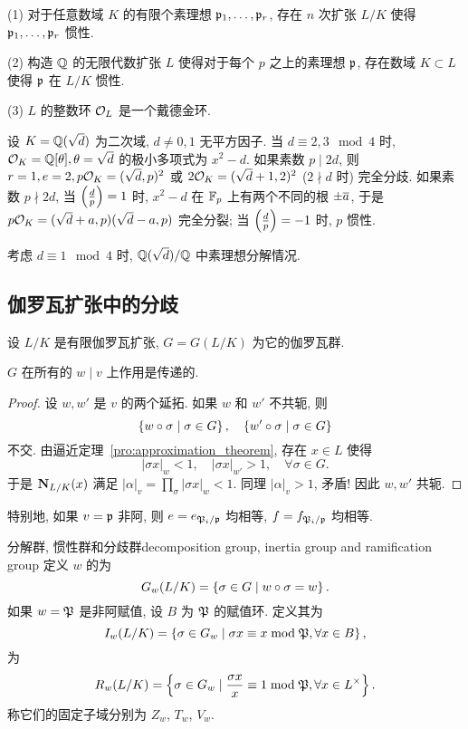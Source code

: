 \begin{exercise}
(1) 对于任意数域 $K$ 的有限个素理想 ${\mathfrak{p}}_1,\dots,{\mathfrak{p}}_r$, 存在 $n$ 次扩张 $L/K$ 使得 ${\mathfrak{p}}_1,\dots,{\mathfrak{p}}_r$ 惯性.

(2) 构造 ${\mathbb{Q}}$ 的无限代数扩张 $L$ 使得对于每个 $p$ 之上的素理想 ${\mathfrak{p}}$, 存在数域 $K\subset L$ 使得 ${\mathfrak{p}}$ 在 $L/K$ 惯性.

(3) $L$ 的整数环 ${\mathcal{O}}_L$ 是一个戴德金环.
\end{exercise}

\begin{example}
设 $K={\mathbb{Q}}(\sqrt{d})$ 为二次域, $d\neq 0,1$ 无平方因子. 
当 $d\equiv 2,3\mod 4$ 时, ${\mathcal{O}}_K={\mathbb{Q}}[\theta],\theta=\sqrt{d}$ 的极小多项式为 $x^2-d$. 如果素数 $p\mid 2d$, 则 $r=1,e=2,p{\mathcal{O}}_K=(\sqrt{d},p)^2$ 或 $2{\mathcal{O}}_K=(\sqrt{d}+1,2)^2$ ($2\nmid d$ 时) 完全分歧.  如果素数 $p\nmid 2d$, 当 $\left(\frac{{d}}{p}\right)=1$ 时, $x^2-d$ 在 ${\mathbb{F}}_p$ 上有两个不同的根 $\pm\overline a$, 于是 $p{\mathcal{O}}_K=(\sqrt{d}+a,p)(\sqrt{d}-a,p)$ 完全分裂; 当 $\left(\frac{{d}}{p}\right)=-1$ 时, $p$ 惯性.
\end{example}

\begin{exercise}
考虑 $d\equiv 1\mod 4$ 时, ${\mathbb{Q}}(\sqrt{d})/{\mathbb{Q}}$ 中素理想分解情况.
\end{exercise}


\subsection{伽罗瓦扩张中的分歧}
设 $L/K$ 是有限伽罗瓦扩张, $G=G(L/K)$ 为它的伽罗瓦群.
\begin{proposition}{}{}
$G$ 在所有的 $w\mid v$ 上作用是传递的.
\end{proposition}
\begin{proof}
设 $w,w'$ 是 $v$ 的两个延拓. 如果 $w$ 和 $w'$ 不共轭, 则
  \[\left\{w\circ \sigma\mid \sigma\in G\right\},\quad
\left\{w'\circ\sigma\mid\sigma\in G\right\}\]
不交. 由逼近定理~\ref{pro:approximation_theorem}, 存在 $x\in L$ 使得
  \[|\sigma x|_w<1,\quad |\sigma x|_{w'}>1,\quad\forall \sigma\in G.\]
于是 ${\mathbf{N}}_{L/K}(x)$ 满足 $|\alpha|_v=\prod_\sigma|\sigma x|_w<1$. 同理 $|\alpha|_v>1$, 矛盾! 因此 $w,w'$ 共轭.
\end{proof}

特别地, 如果 $v={\mathfrak{p}}$ 非阿, 则 $e=e_{{\mathfrak{P}}_i/{\mathfrak{p}}}$ 均相等, $f=f_{{\mathfrak{P}}_i/{\mathfrak{p}}}$ 均相等.

\begin{definition}{分解群, 惯性群和分歧群}{decomposition group, inertia group and ramification group}
定义 $w$ 的为
  \[G_w(L/K)=\left\{\sigma\in G\mid  w\circ \sigma=w\right\}.\]
如果 $w={\mathfrak{P}}$ 是非阿赋值, 设 $B$ 为 ${\mathfrak{P}}$ 的赋值环. 定义其为
  \[I_w(L/K)=\left\{\sigma\in G_w\mid \sigma x\equiv x\bmod{\mathfrak{P}},\forall x\in B\right\},\]
为
  \[R_w(L/K)=\left\{\sigma\in G_w\mid \frac{\sigma x}{x}\equiv 1\bmod {\mathfrak{P}},\forall x\in L^\times\right\}.\]
称它们的固定子域分别为 $Z_w$,  $T_w$,  $V_w$.
\end{definition}

